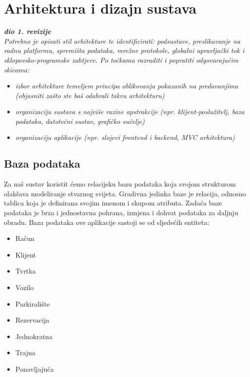 \chapter{Arhitektura i dizajn sustava}
		
		\textbf{\textit{dio 1. revizije}}\\

		\textit{ Potrebno je opisati stil arhitekture te identificirati: podsustave, preslikavanje na radnu platformu, spremišta podataka, mrežne protokole, globalni upravljački tok i sklopovsko-programske zahtjeve. Po točkama razraditi i popratiti odgovarajućim skicama:}
	\begin{itemize}
		\item 	\textit{izbor arhitekture temeljem principa oblikovanja pokazanih na predavanjima (objasniti zašto ste baš odabrali takvu arhitekturu)}
		\item 	\textit{organizaciju sustava s najviše razine apstrakcije (npr. klijent-poslužitelj, baza podataka, datotečni sustav, grafičko sučelje)}
		\item 	\textit{organizaciju aplikacije (npr. slojevi frontend i backend, MVC arhitektura) }		
	\end{itemize}

	
		

		

		\pagebreak		
		\section{Baza podataka}
			
		Za naš sustav koristit ćemo relacijsku bazu podataka koja svojom strukturom olakšava modeliranje stvarnog svijeta. Gradivna jedinka baze je relacija, odnosno tablica koja je definirana svojim imenom i skupom atributa. Zadaća baze podataka je brza i jednostavna pohrana, izmjena i dohvat podataka za daljnju obradu.
		\newline
        Baza podataka ove aplikacije sastoji se od sljedećih entiteta: 
        \begin{itemize}
            \item Račun
            \item Klijent
            \item Tvrtka
            \item Vozilo
            \item Parkiralište
            \item Rezervacija
            \item Jednokratna
            \item Trajna
            \item Ponavljajuća
        \end{itemize}
        
